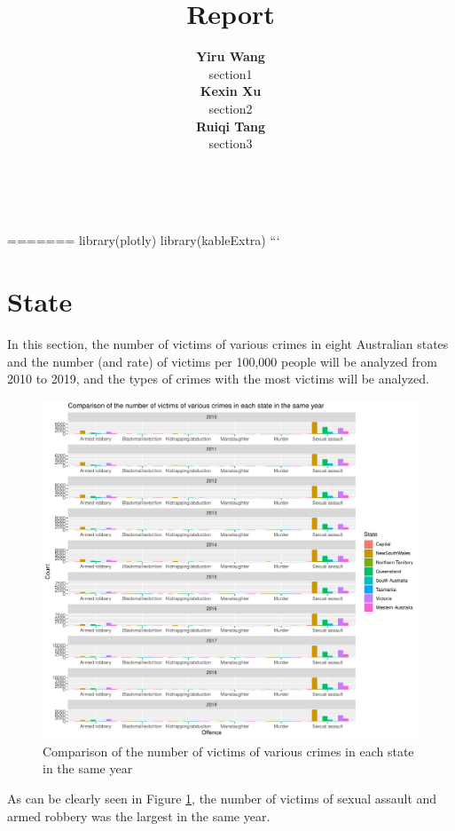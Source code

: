 \documentclass[11pt,a4paper,]{article}
\title{Report}
\author{\sf\Large\textbf{ Yiru Wang}\\ {\sf\large section1\\[0.5cm]} \sf\Large\textbf{ Kexin Xu}\\ {\sf\large section2\\[0.5cm]} \sf\Large\textbf{ Ruiqi Tang}\\ {\sf\large section3\\[0.5cm]}}
\date{\sf\Date~\Month~\Year}
\makeatletter
\def\titlepage{\front{\expandafter{\@title}}{\@author}{\@organization}}
\makeatother
\begin{document}
\titlepage

=======
library(plotly)
library(kableExtra)
```

\clearpage

\section*{State}

In this section, the number of victims of various crimes in eight Australian states and the number (and rate) of victims per 100,000 people will be analyzed from 2010 to 2019, and the types of crimes with the most victims will be analyzed.

\begin{figure}
\centering
\includegraphics{report_files/figure-latex/plot1-1.pdf}
\caption{\label{fig:plot1}Comparison of the number of victims of various crimes in each state in the same year}
\end{figure}

As can be clearly seen in Figure \ref{fig:plot1}, the number of victims of sexual assault and armed robbery was the largest in the same year.
\end{document}
